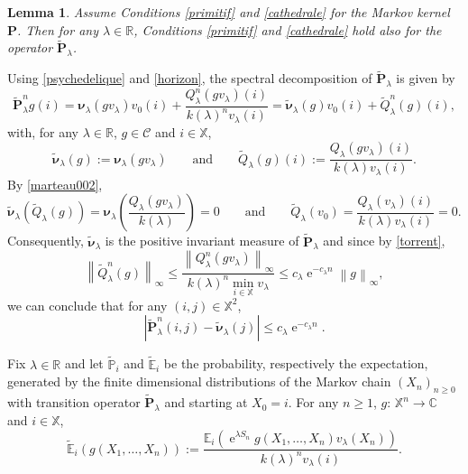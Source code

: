 \documentclass[12pt]{amsart}
\newtheorem{lemma}[theorem]{Lemma}
\theoremstyle{definition}
\numberwithin{equation}{section}
\newcommand*{\abs}[1]{\left\lvert#1\right\rvert}
\newcommand*{\norm}[1]{\left\lVert#1\right\rVert}
\def\bb#1{\mathbb{#1}}
\def\bs#1{\boldsymbol{#1}}
\def\bf#1{\mathbf{#1}}
\def\scr#1{\mathscr{#1}}
\def\tt#1{\tilde{#1}}
\def\tbf#1{\tilde{\mathbf{#1}}}
\def\tbs#1{\tilde{\boldsymbol{#1}}}
\def\tbb#1{\tilde{\mathbb{#1}}}
\def\geq{\geqslant}
\def\leq{\leqslant}
\renewcommand\ll{\lambda}
\DeclareMathOperator{\e}{e}
\begin{document}
\begin{lemma}
\label{jument}
Assume Conditions \ref{primitif} and \ref{cathedrale} for the Markov kernel $\bf P$. Then for any $\ll \in \bb R$, Conditions \ref{primitif} and \ref{cathedrale} hold also for the operator $\tbf P_{\ll}$.
\end{lemma}
Using \eqref{psychedelique} and \eqref{horizon}, the spectral decomposition of $\tbf P_{\ll}$ is given by
\[
\tbf P_{\ll}^n g(i) = \bs \nu_{\ll} \left( gv_{\ll} \right)v_0(i) + \frac{Q_{\ll}^n(gv_{\ll})(i)}{k(\ll)^nv_{\ll}(i)} = \tbs \nu_{\ll}(g) v_0(i) + \tt Q_{\ll}^n(g)(i),
\]
with, for any $\ll \in \bb R$, $g \in \scr C$ and $i \in \bb X$,
\begin{equation}
	\label{ecorce}
	\tbs \nu_{\ll}(g) := \bs \nu_{\ll} \left( gv_{\ll} \right) \qquad \text{and} \qquad \tt Q_{\ll}(g)(i) := \frac{Q_{\ll}(gv_{\ll})(i)}{k(\ll)v_{\ll}(i)}.
\end{equation}
By \eqref{marteau002},
\[
\tbs \nu_{\ll} \left( \tt Q_{\ll}(g) \right) = \bs \nu_{\ll} \left( \frac{Q_{\ll}(g v_{\ll})}{k(\ll)} \right) = 0 \qquad \text{and} \qquad \tt Q_{\ll}(v_0) = \frac{Q_{\ll}(v_{\ll})(i)}{k(\ll)v_{\ll}(i)} = 0.
\]
Consequently, $\tbs \nu_{\ll}$ is the positive invariant measure of $\tbf P_{\ll}$ and since by \eqref{torrent},
\[
\norm{\tt Q_{\ll}^n(g)}_{\infty} \leq \frac{\norm{Q_{\ll}^n(gv_{\ll})}_{\infty}}{k(\ll)^n \min_{i \in \bb X} v_{\ll}} \leq c_{\ll} \e^{-c_{\ll}n} \norm{g}_{\infty},
\]
we can conclude that for any $(i,j) \in \bb X^2$,
\[
\abs{\tbf P_{\ll}^n (i,j) - \tbs \nu_{\ll}(j)} \leq c_{\ll} \e^{-c_{\ll}n}.
\]

Fix $\ll \in \bb R$ and let $\tbb P_i$ and $\tbb E_i$ be the probability, respectively the expectation, generated by the finite dimensional distributions of the Markov chain $(X_n)_{n\geq 0}$ with transition operator $\tbf P_{\ll}$ and starting at $X_0=i$. For any $n \geq 1$, $g$: $\bb X^n \to \bb C$ and $i \in \bb X$,
\begin{equation}
	\label{chandelle}
	\tbb E_i \left( g(X_1, \dots, X_n) \right) := \frac{\bb E_i \left( \e^{\ll S_n} g(X_1, \dots, X_n) v_{\ll}(X_n) \right)}{k(\ll)^n v_{\ll}(i)}.
\end{equation}
\end{document}
